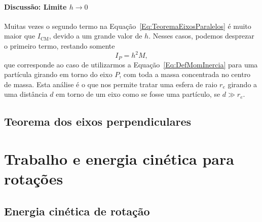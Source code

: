 \paragraph{Discussão: Limite $h \to 0$}

Muitas vezes o segundo termo na Equação~\eqref{Eq:TeoremaEixosParalelos} é muito maior que $I_{\textrm{CM}}$, devido a um grande valor de $h$. Nesses casos, podemos desprezar o primeiro termo, restando somente
\begin{equation}
  I_P = h^2 M,
\end{equation}
%
que corresponde ao caso de utilizarmos a Equação~\eqref{Eq:DefMomInercia} para uma partícula girando em torno do eixo $P$, com toda a massa concentrada no centro de massa. Esta análise é o que nos permite tratar uma esfera de raio $r_e$ girando a uma distância $d$ em torno de um eixo como se fosse uma partículo, se $d \gg r_e$.

\subsection{Teorema dos eixos perpendiculares}


\section{Trabalho e energia cinética para rotações}

\subsection{Energia cinética de rotação}

